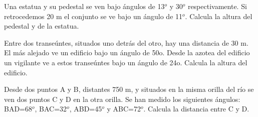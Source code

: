 \begin{mipropuesto}
	
	Una estatua y su pedestal se ven bajo ángulos de 13$^o$ y 30$^o$ respectivamente. Si retrocedemos 20 m el conjunto se ve bajo un ángulo de 11$^o$. Calcula la altura del pedestal y de la estatua.
\end{mipropuesto}

\vspace{-8mm}
\begin{flushright}
\begin{footnotesize} \textcolor{gris}{}	\end{footnotesize}
\end{flushright}

\begin{mipropuesto}
	
	Entre dos transeúntes, situados uno detrás del otro, hay una distancia de 30 m. El más alejado ve un edificio bajo un ángulo de 50o. Desde la azotea del edificio un vigilante ve a estos transeúntes bajo un ángulo de 24o. Calcula la altura del edificio.
\end{mipropuesto}

\vspace{-8mm}
\begin{flushright}
\begin{footnotesize} \textcolor{gris}{}	\end{footnotesize}
\end{flushright}

\begin{mipropuesto}
	
	Desde dos puntos A y B, distantes 750 m, y situados en la misma orilla del río se ven dos puntos C y D en la otra orilla. Se han medido los siguientes ángulos: BAD=68$^o$, BAC=32$^o$, ABD=45$^o$ y ABC=72$^o$. Calcula la distancia entre C y D.
\end{mipropuesto}

\vspace{-8mm}
\begin{flushright}
\begin{footnotesize} \textcolor{gris}{}	\end{footnotesize}
\end{flushright}

